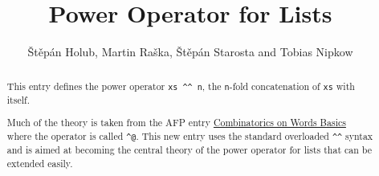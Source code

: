 \documentclass[11pt,a4paper]{article}
\begin{document}
\title{Power Operator for Lists}
\author{\v{S}t\v{e}pán Holub, Martin Ra\v{s}ka, \v{S}t\v{e}pán Starosta and Tobias Nipkow}
\maketitle

\begin{abstract}
  This entry defines the power operator \verb!xs ^^ n!, the \texttt{n}-fold
  concatenation of \texttt{xs} with itself.

  Much of the theory is taken from the AFP entry
  \href{https://www.isa-afp.org/entries/Combinatorics_Words.html}
  {Combinatorics on Words Basics} where
  the operator is called \verb!^@!. This new entry uses the
  standard overloaded \verb!^^! syntax and is aimed at becoming the
  central theory of the power operator for lists that can be extended easily.
\end{abstract}


\end{document}
